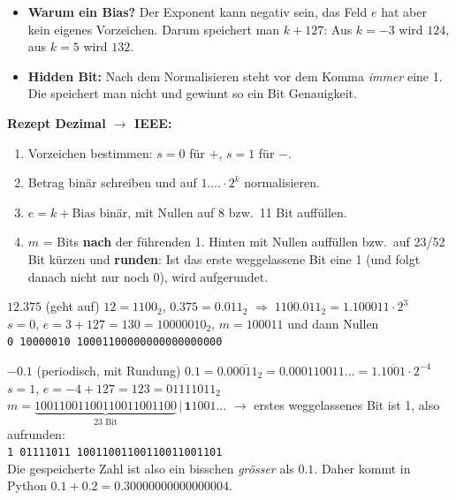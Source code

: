 \begin{merke}
  \begin{itemize}[nosep]
    \item \textbf{Warum ein Bias?} Der Exponent kann negativ sein, das Feld $e$ hat aber
          kein eigenes Vorzeichen. Darum speichert man $k + 127$: Aus $k = -3$ wird $124$,
          aus $k = 5$ wird $132$.
    \item \textbf{Hidden Bit:} Nach dem Normalisieren steht vor dem Komma \emph{immer}
          eine 1. Die speichert man nicht und gewinnt so ein Bit Genauigkeit.
  \end{itemize}
\end{merke}

\textbf{Rezept Dezimal $\to$ IEEE:}
\begin{enumerate}[nosep]
  \item Vorzeichen bestimmen: $s = 0$ für $+$, $s = 1$ für $-$.
  \item Betrag binär schreiben und auf $1.\ldots \cdot 2^k$ normalisieren.
  \item $e = k + \text{Bias}$ binär, mit Nullen auf 8 bzw.\ 11 Bit auffüllen.
  \item $m$ = Bits \textbf{nach} der führenden 1. Hinten mit Nullen auffüllen bzw.\
        auf 23/52 Bit kürzen und \textbf{runden}: Ist das erste weggelassene Bit eine 1
        (und folgt danach nicht nur noch 0), wird aufgerundet.
\end{enumerate}

\begin{beispiel}{$12.375$ (geht auf)}
  $12 = 1100_2$, \; $0.375 = 0.011_2$ \;$\Rightarrow\; 1100.011_2 = 1.100011 \cdot 2^{3}$\\
  $s = 0$, \; $e = 3 + 127 = 130 = 10000010_2$, \; $m = 100011$ und dann Nullen\\[2pt]
  \hspace*{1em}\texttt{0 10000010 10001100000000000000000}
\end{beispiel}

\begin{beispiel}{$-0.1$ (periodisch, mit Rundung)}
  $0.1 = 0.0\overline{0011}_2 = 0.000110011\ldots = 1.\overline{1001} \cdot 2^{-4}$\\
  $s = 1$, \; $e = -4 + 127 = 123 = 01111011_2$\\
  $m = \underbrace{10011001100110011001100}_{23 \text{ Bit}}\,|\,\mathbf{1}1001\ldots$
  \;$\to$ erstes weggelassenes Bit ist 1, also aufrunden:\\[2pt]
  \hspace*{1em}\texttt{1 01111011 10011001100110011001101}\\[2pt]
  Die gespeicherte Zahl ist also ein bisschen \emph{grösser} als $0.1$. Daher kommt
  in Python $0.1 + 0.2 = 0.30000000000000004$.
\end{beispiel}

